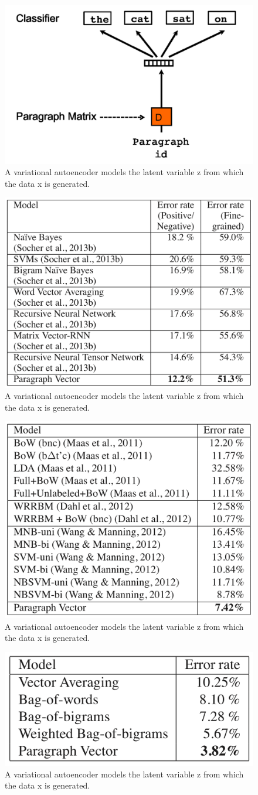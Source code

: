 \begin{figure}
\centering
  \includegraphics[width=.5\linewidth]{files/doc2vec-3.png}
  \caption{A variational autoencoder models the latent variable z from which the data x is generated.}
  \label{fig:vae}
\end{figure}

\begin{figure}
\centering
  \includegraphics[width=.5\linewidth]{files/doc2vec-4.png}
  \caption{A variational autoencoder models the latent variable z from which the data x is generated.}
  \label{fig:vae}
\end{figure}

\begin{figure}
\centering
  \includegraphics[width=.5\linewidth]{files/doc2vec-5.png}
  \caption{A variational autoencoder models the latent variable z from which the data x is generated.}
  \label{fig:vae}
\end{figure}

\begin{figure}
\centering
  \includegraphics[width=.5\linewidth]{files/doc2vec-6.png}
  \caption{A variational autoencoder models the latent variable z from which the data x is generated.}
  \label{fig:vae}
\end{figure}


